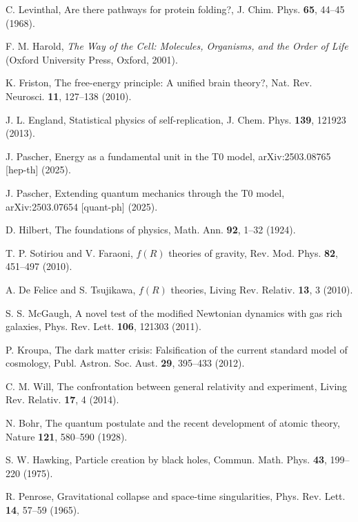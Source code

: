 \documentclass[twocolumn,aps,prl]{revtex4-2}
\begin{document}
\begin{thebibliography}{99}
		 C. Levinthal, Are there pathways for protein folding?, J. Chim. Phys. \textbf{65}, 44--45 (1968).
		
		 F. M. Harold, \textit{The Way of the Cell: Molecules, Organisms, and the Order of Life} (Oxford University Press, Oxford, 2001).
		
		 K. Friston, The free-energy principle: A unified brain theory?, Nat. Rev. Neurosci. \textbf{11}, 127--138 (2010).
		
		 J. L. England, Statistical physics of self-replication, J. Chem. Phys. \textbf{139}, 121923 (2013).
		
		 J. Pascher, Energy as a fundamental unit in the T0 model, arXiv:2503.08765 [hep-th] (2025).
		
		 J. Pascher, Extending quantum mechanics through the T0 model, arXiv:2503.07654 [quant-ph] (2025).
		
		 D. Hilbert, The foundations of physics, Math. Ann. \textbf{92}, 1--32 (1924).
		
		 T. P. Sotiriou and V. Faraoni, $f(R)$ theories of gravity, Rev. Mod. Phys. \textbf{82}, 451--497 (2010).
		
		 A. De Felice and S. Tsujikawa, $f(R)$ theories, Living Rev. Relativ. \textbf{13}, 3 (2010).
		
		 S. S. McGaugh, A novel test of the modified Newtonian dynamics with gas rich galaxies, Phys. Rev. Lett. \textbf{106}, 121303 (2011).
		
		 P. Kroupa, The dark matter crisis: Falsification of the current standard model of cosmology, Publ. Astron. Soc. Aust. \textbf{29}, 395--433 (2012).
		
		 C. M. Will, The confrontation between general relativity and experiment, Living Rev. Relativ. \textbf{17}, 4 (2014).
		
		 N. Bohr, The quantum postulate and the recent development of atomic theory, Nature \textbf{121}, 580--590 (1928).
		
		 S. W. Hawking, Particle creation by black holes, Commun. Math. Phys. \textbf{43}, 199--220 (1975).
		
		 R. Penrose, Gravitational collapse and space-time singularities, Phys. Rev. Lett. \textbf{14}, 57--59 (1965).
		

\end{thebibliography}
\end{document}
